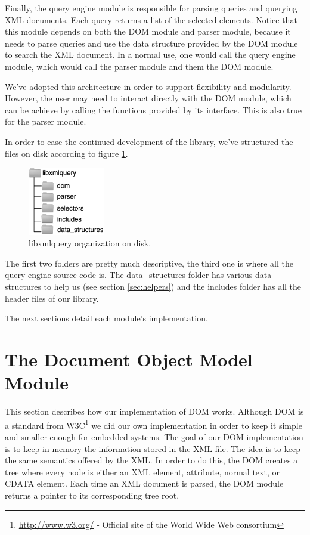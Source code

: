 \documentclass[a4paper]{report}
\begin{document}
	Finally, the query engine module is responsible for parsing queries and querying XML documents. Each query returns a list of the selected elements. Notice that this module depends on both the DOM module and parser 
	module, because it needs to parse queries and use the data structure provided by the DOM module to search the XML document. In a normal use, one would call the query engine module, which would call the parser 
	module and them the DOM module.
	
	We've adopted this architecture in order to support flexibility and modularity. However, the user may need to interact directly with the DOM module, which can be achieve by calling the functions provided by its interface.
	This is also true for the parser module. 
	
	In order to ease the continued development of the library, we've structured the files on disk according to figure \ref{fig:disk}.

	 \begin{figure}[h!]
		\centering
		\label{fig:disk}
		\includegraphics[width=0.30\textwidth] {disk}
		\caption{libxmlquery organization on disk.}
	 \end{figure}
	
	The first two folders are pretty much descriptive, the third one is where all the query engine source code is. The data\_structures folder has various data structures to help us (see section \ref{sec:helpers}) and the includes 
	folder has all the header files of our library.
	
	The next sections detail each module's implementation.

\section{The Document Object Model Module}\label{sec:dom}
	This section describes how our implementation of DOM works. Although DOM is a standard from W3C\footnote{\url{http://www.w3.org/} - Official site of the World Wide Web consortium} we did our own implementation in order 
	to keep it simple and smaller enough for embedded systems. The goal of our DOM implementation is to keep in memory the information stored in the XML file. The idea is to keep the same semantics offered by the XML. In
	order to do this, the DOM creates a tree where every node is either an XML element, attribute, normal text, or CDATA element. Each time an XML document is parsed, the DOM module returns a pointer to its corresponding
	tree root.
	
\end{document}
